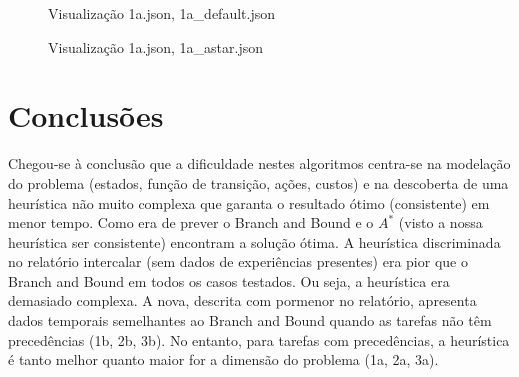 \documentclass[a4paper,11pt]{article}
\begin{document}
\begin{figure}[H]
	\centering
	\caption{Visualização 1a.json, 1a\_default.json}
	\label{fig:1adefault}
\end{figure}

\begin{figure}[H]
	\centering
	\caption{Visualização 1a.json, 1a\_astar.json}
	\label{fig:1aastar}
\end{figure}

\section{Conclusões}

Chegou-se à conclusão que a dificuldade nestes algoritmos centra-se na modelação do problema (estados, função de transição, ações, custos) e na descoberta de uma heurística não muito complexa que garanta o resultado ótimo (consistente) em menor tempo. Como era de prever o Branch and Bound e o $A^*$ (visto a nossa heurística ser consistente) encontram a solução ótima. A heurística discriminada no relatório intercalar (sem dados de experiências presentes) era pior que o Branch and Bound em todos os casos testados. Ou seja, a heurística era demasiado complexa. A nova, descrita com pormenor no relatório, apresenta dados temporais semelhantes ao Branch and Bound quando as tarefas não têm precedências (1b, 2b, 3b). No entanto, para tarefas com precedências, a heurística é tanto melhor quanto maior for a dimensão do problema (1a, 2a, 3a).
\end{document}
